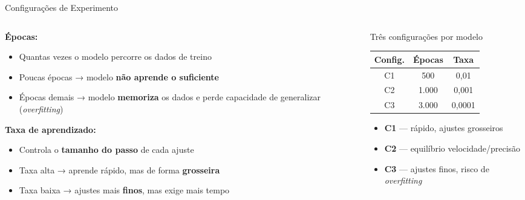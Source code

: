 \documentclass[aspectratio=169,11pt,brazil]{beamer}
\begin{document}
\begin{frame}{Configurações de Experimento}
  \begin{columns}[T]
    \begin{column}{0.55\textwidth}
      \textbf{Épocas:}
      \begin{itemize}
        \item Quantas vezes o modelo percorre os dados de treino
        \item Poucas épocas → modelo \textbf{não aprende o suficiente}
        \item Épocas demais → modelo \textbf{memoriza} os dados e perde capacidade de generalizar (\textit{overfitting})
      \end{itemize}
      \vspace{0.4em}
      \textbf{Taxa de aprendizado:}
      \begin{itemize}
        \item Controla o \textbf{tamanho do passo} de cada ajuste
        \item Taxa alta → aprende rápido, mas de forma \textbf{grosseira}
        \item Taxa baixa → ajustes mais \textbf{finos}, mas exige mais tempo
      \end{itemize}
    \end{column}
    \begin{column}{0.45\textwidth}
      \begin{block}{Três configurações por modelo}
        \vspace{0.1em}
        \centering
        \renewcommand{\arraystretch}{1.3}
        \begin{tabular}{ccc}
          \toprule
          \textbf{Config.} & \textbf{Épocas} & \textbf{Taxa} \\
          \midrule
          C1 & 500     & 0,01    \\
          C2 & 1.000   & 0,001   \\
          C3 & 3.000   & 0,0001  \\
          \bottomrule
        \end{tabular}
      \end{block}
      \vspace{0.25em}
      \small
      \begin{itemize}\setlength{\itemsep}{2pt}
        \item \textbf{C1} — rápido, ajustes grosseiros
        \item \textbf{C2} — equilíbrio velocidade/precisão
        \item \textbf{C3} — ajustes finos, risco de \textit{overfitting}
      \end{itemize}
    \end{column}
  \end{columns}
\end{frame}
\end{document}
